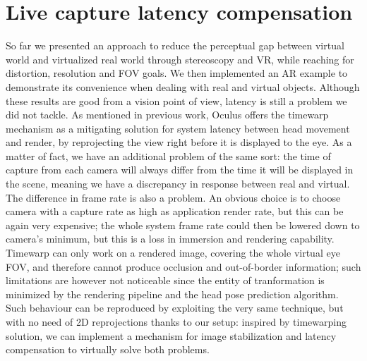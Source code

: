\section{Live capture latency compensation}
So far we presented an approach to reduce the perceptual gap between virtual world and virtualized real world through stereoscopy and VR, while reaching for distortion, resolution and FOV goals. We then implemented an AR example to demonstrate its convenience when dealing with real and virtual objects. Although these results are good from a vision point of view, latency is still a problem we did not tackle.
As mentioned in previous work, Oculus offers the timewarp mechanism as a mitigating solution for system latency between head movement and render, by reprojecting the view right before it is displayed to the eye. As a matter of fact, we have an additional problem of the same sort: the time of capture from each camera will always differ from the time it will be displayed in the scene, meaning we have a discrepancy in response between real and virtual.\\
The difference in frame rate is also a problem. An obvious choice is to choose camera with a capture rate as high as application render rate, but this can be again very expensive; the whole system frame rate could then be lowered down to camera's minimum, but this is a loss in immersion and rendering capability.
Timewarp can only work on a rendered image, covering the whole virtual eye FOV, and therefore cannot produce occlusion and out-of-border information; such limitations are however not noticeable since the entity of tranformation is minimized by the rendering pipeline and the head pose prediction algorithm. Such behaviour can be reproduced by exploiting the very same technique, but with no need of 2D reprojections thanks to our setup: inspired by timewarping solution, we can implement a mechanism for image stabilization and latency compensation to virtually solve both problems.

